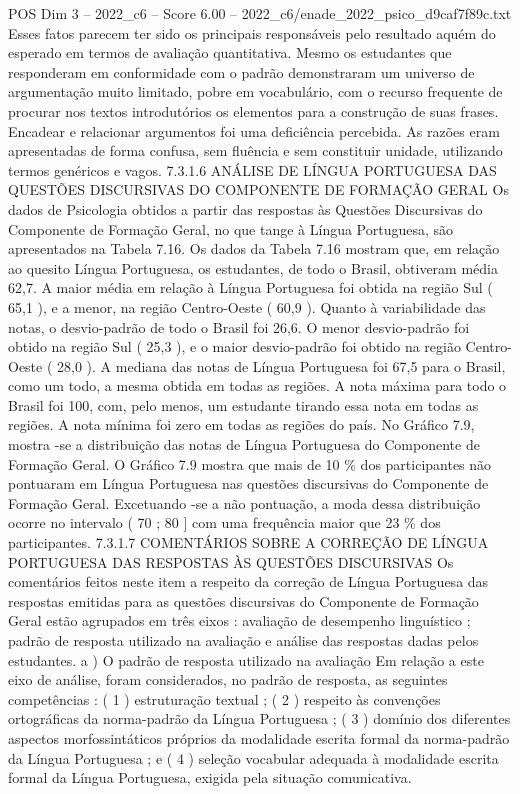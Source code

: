 \begin{textsample}{POS Dim 3 – 2022\_c6 – Score 6.00 – 2022\_c6/enade\_2022\_psico\_d9caf7f89c.txt}
Esses fatos parecem ter sido os principais responsáveis pelo resultado aquém do esperado em termos de avaliação quantitativa.
Mesmo os estudantes que responderam em conformidade com o padrão demonstraram um universo de argumentação muito limitado, pobre em vocabulário, com o recurso frequente de procurar nos textos introdutórios os elementos para a construção de suas frases.
Encadear e relacionar argumentos foi uma deficiência percebida.
As razões eram apresentadas de forma confusa, sem fluência e sem constituir unidade, utilizando termos genéricos e vagos. 7.3.1.6 ANÁLISE DE LÍNGUA PORTUGUESA DAS QUESTÕES DISCURSIVAS DO COMPONENTE DE FORMAÇÃO GERAL Os dados de Psicologia obtidos a partir das respostas às Questões Discursivas do Componente de Formação Geral, no que tange à Língua Portuguesa, são apresentados na Tabela 7.16.
Os dados da Tabela 7.16 mostram que, em relação ao quesito Língua Portuguesa, os estudantes, de todo o Brasil, obtiveram média 62,7.
A maior média em relação à Língua Portuguesa foi obtida na região Sul ( 65,1 ), e a menor, na região Centro-Oeste ( 60,9 ).
Quanto à variabilidade das notas, o desvio-padrão de todo o Brasil foi 26,6.
O menor desvio-padrão foi obtido na região Sul ( 25,3 ), e o maior desvio-padrão foi obtido na região Centro-Oeste ( 28,0 ).
A mediana das notas de Língua Portuguesa foi 67,5 para o Brasil, como um todo, a mesma obtida em todas as regiões.
A nota máxima para todo o Brasil foi 100, com, pelo menos, um estudante tirando essa nota em todas as regiões.
A nota mínima foi zero em todas as regiões do país.
No Gráfico 7.9, mostra -se a distribuição das notas de Língua Portuguesa do Componente de Formação Geral.
O Gráfico 7.9 mostra que mais de 10 \% dos participantes não pontuaram em Língua Portuguesa nas questões discursivas do Componente de Formação Geral.
Excetuando -se a não pontuação, a moda dessa distribuição ocorre no intervalo ( 70 ; 80 ] com uma frequência maior que 23 \% dos participantes. 7.3.1.7 COMENTÁRIOS SOBRE A CORREÇÃO DE LÍNGUA PORTUGUESA DAS RESPOSTAS ÀS QUESTÕES DISCURSIVAS Os comentários feitos neste item a respeito da correção de Língua Portuguesa das respostas emitidas para as questões discursivas do Componente de Formação Geral estão agrupados em três eixos : avaliação de desempenho linguístico ; padrão de resposta utilizado na avaliação e análise das respostas dadas pelos estudantes. a ) O padrão de resposta utilizado na avaliação Em relação a este eixo de análise, foram considerados, no padrão de resposta, as seguintes competências : ( 1 ) estruturação textual ; ( 2 ) respeito às convenções ortográficas da norma-padrão da Língua Portuguesa ; ( 3 ) domínio dos diferentes aspectos morfossintáticos próprios da modalidade escrita formal da norma-padrão da Língua Portuguesa ; e ( 4 ) seleção vocabular adequada à modalidade escrita formal da Língua Portuguesa, exigida pela situação comunicativa.

\end{textsample}
